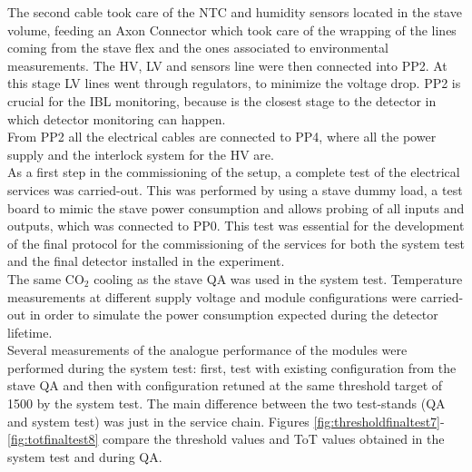 The second cable took care of the NTC and humidity sensors located in the stave volume, feeding an Axon Connector which took care of the wrapping of the lines coming from the stave flex and the ones associated to environmental measurements. The HV, LV and sensors line were then connected into PP2. At this stage LV lines went through regulators, to minimize the voltage drop. PP2 is crucial for the IBL monitoring, because is the closest stage to the detector in which detector monitoring can happen.\\
From PP2 all the electrical cables are connected to PP4, where all the power supply and the interlock system for the HV are.\\
As a first step in the commissioning of the setup, a complete test of the electrical services was carried-out. This was performed by using a stave dummy load, a test board to mimic the stave power consumption and allows probing of all inputs and outputs, which was connected to PP0. This test was essential for the development of the final protocol for the commissioning of the services for both the system test and the final detector installed in the experiment.\\
The same CO$_{2}$ cooling as the stave QA was used in the system test. Temperature measurements at different supply voltage and module configurations were carried-out in order to simulate the power consumption expected during the detector lifetime.\\
Several measurements of the analogue performance of the modules were performed during the system test: first, test with existing configuration from the stave QA and then with configuration retuned at the same threshold target of \SI{1500}{\e} by the system test. The main difference between the two test-stands (QA and system test) was just in the service chain.
Figures \ref{fig:thresholdfinaltest7}-\ref{fig:totfinaltest8} compare the threshold values and ToT values obtained in the system test and during QA.
